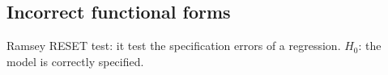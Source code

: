 \documentclass[10pt, a4paper, landscape]{extarticle}
\begin{document}
\begin{multicols}{3}
\section*{Incorrect functional forms}
	Ramsey RESET test: it test the specification errors of a regression. $H_0$: the model is correctly specified.

\columnbreak

\end{multicols}
\end{document}
